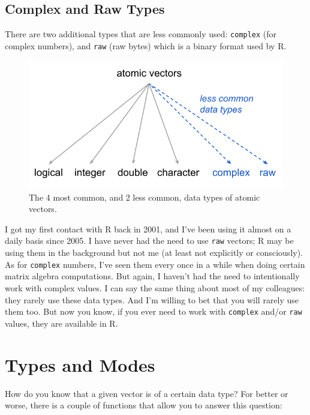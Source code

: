 \documentclass[
]{book}
\begin{document}
\hypertarget{complex-and-raw-types}{%
\subsection{Complex and Raw Types}\label{complex-and-raw-types}}

There are two additional types that are less commonly used: \texttt{complex}
(for complex numbers), and \texttt{raw} (raw bytes) which is a binary format used by R.

\begin{figure}

{\centering \includegraphics[width=0.6\linewidth]{images/objects/obj-vector-atomic-types2} 

}

\caption{The 4 most common, and 2 less common, data types of atomic vectors.}\label{fig:unnamed-chunk-19}
\end{figure}

I got my first contact with R back in 2001, and I've been using it almost on a
daily basis since 2005. I have never had the need to use \texttt{raw} vectors; R may
be using them in the background but not me (at least not explicitly or
consciously). As for \texttt{complex} numbers, I've seen them every once in a while
when doing certain matrix algebra computations. But again, I haven't
had the need to intentionally work with complex values. I can say the same thing
about most of my colleagues: they rarely use these data types. And I'm willing
to bet that you will rarely use them too. But now you know, if you ever need
to work with \texttt{complex} and/or \texttt{raw} values, they are available in R.

\hypertarget{types-and-modes}{%
\section{Types and Modes}\label{types-and-modes}}

How do you know that a given vector is of a certain data type? For better or
worse, there is a couple of functions that allow you to answer this question:
\end{document}
